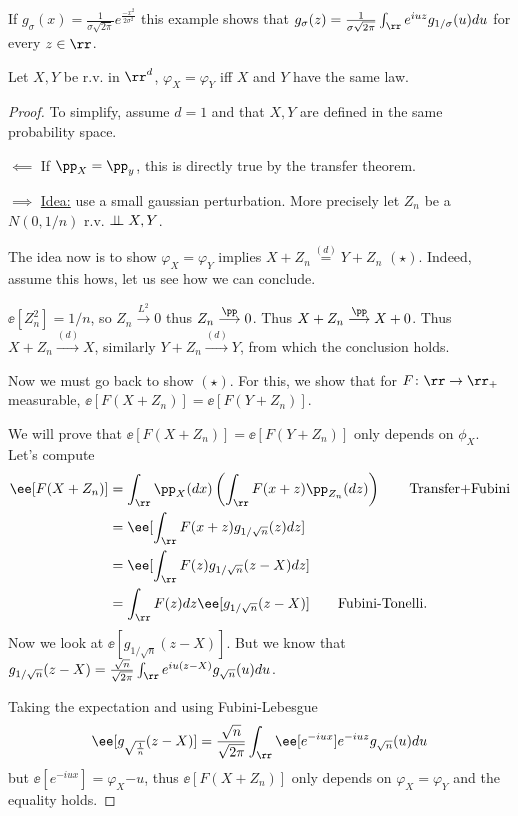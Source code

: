 \documentclass[../main.tex]{subfiles}
\begin{document}
\begin{remark}
  If $g_{\sigma}(x) = \frac{1}{\sigma\sqrt{2\pi}} e^{\frac{-x^2}{2 \sigma^2} }$ this
  example shows that $g_{\sigma}(z) = \frac{1}{\sigma \sqrt{2\pi}} \int_{\rr}
  e^{iuz} g_{1/\sigma}(u) du$ for every $z \in \rr$.
\end{remark}

\begin{theorem}
    Let $X, Y$ be r.v. in $\rr^d$, $\varphi_X = \varphi_Y$ iff $X$ and $Y$ have the
    same law.
\end{theorem}
\begin{proof}
    To simplify, assume $d = 1$ and that $X, Y$ are defined in the same
    probability space.

    $\boxed{\impliedby}$ If $\pp_X = \pp_y$, this is directly true by the
    transfer theorem.

    $\boxed{\implies}$
    \underline{Idea:} use a small gaussian perturbation. More precisely let
    $Z_n$ be a $N(0, 1/n)$ r.v. $\perp\!\!\!\!\,\perp X, Y$.

    The idea now is to show $\varphi_X = \varphi_Y$ implies $X + Z_n
    \overset{(d)}{=} Y + Z_n$ $(\star)$. Indeed, assume this hows, let us see
    how we can conclude.

    $\ee[Z_n^2] = 1/n$, so $Z_n \overset{L^2}{\longrightarrow} 0$ thus $Z_n
    \overset{\pp}{\longrightarrow} 0$. Thus $X + Z_n
    \overset{\pp}{\longrightarrow} X + 0$. Thus $X + Z_n
    \overset{(d)}{\longrightarrow} X$, similarly $Y + Z_n
    \overset{(d)}{\longrightarrow} Y$, from which the conclusion holds.

    Now we must go back to show $(\star)$. For this, we show that for $F
    \colon \rr \to \rr_+$ measurable, $\ee[F(X + Z_n)] = \ee[F(Y + Z_n)]$.

    We will prove that $\ee[F(X + Z_n)] = \ee[F(Y + Z_n)]$ only depends on
    $\phi_X$. Let's compute
    \begin{align*}
      \ee[F(X + Z_n)] &= \int_{\rr} \pp_X (dx) \left( \int_{\rr} F(x + z)
      \pp_{Z_n}(dz) \right)  \tag*{Transfer+Fubini}\\
      &= \ee[\int_{\rr} F(x + z) g_{1/\sqrt{n}}(z) dz] \\
      &= \ee[\int_{\rr} F(z) g_{1/\sqrt{n}}(z - X)dz] \\
      &= \int_{\rr} F(z)dz \ee[ g_{1/\sqrt{n}} (z - X)] \tag*{Fubini-Tonelli} 
    .\end{align*} 
    Now we look at $\ee[g_{1/\sqrt{n}}(z - X)]$. But we know that
    $g_{1/\sqrt{n}}(z - X) =
    \frac{\sqrt{n}}{\sqrt{2\pi}} \int_{\rr} e^{iu(z - X)} g_{\sqrt{n}}(u) du$.

    Taking the expectation and using Fubini-Lebesgue
    \[
      \ee[g_{\sqrt{\frac{1}{n}}} (z - X)] = \frac{\sqrt{n}}{\sqrt{2\pi}}
      \int_{\rr} \ee[e^{-iux}] e^{-iuz} g_{\sqrt{n}}(u)du
    \] 
    but $\ee[e^{-iux}] = \varphi_X{-u}$, thus $\ee[F(X + Z_n)]$ only depends
    on $\varphi_X = \varphi_Y$ and the equality holds.  
  
\end{proof}
\end{document}
